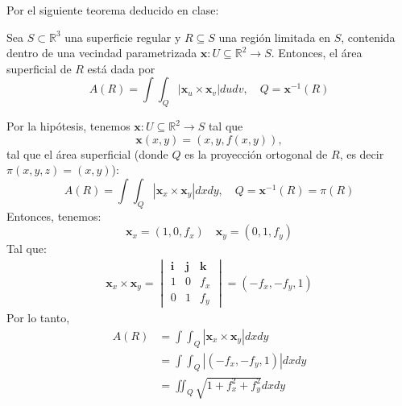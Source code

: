 \begin{problema}
\begin{dem}
\begin{figure}[H]
        \end{figure}
        Por el siguiente teorema deducido en clase: 
        \begin{cajita}
            Sea $S\subset \mathbb{R}^3$ una superficie regular y $R\subseteq S$ una región limitada en $S$, contenida dentro de una vecindad parametrizada $\mathbf{x}:U\subseteq \mathbb{R}^2\to S$. Entonces, el área superficial de $R$ está dada por 
            $$A(R)=\int\int_Q |\mathbf{x}_u\times \mathbf{x}_v|dudv, \quad Q=\mathbf{x}^{-1}(R)$$
        \end{cajita}
        Por la hipótesis, tenemos $\mathbf{x}:U\subseteq\mathbb{R}^2\to S$ tal que 
        $$\mathbf{x}(x,y)=(x,y,f(x,y)),$$
        tal que el área superficial (donde $Q$ es la proyección ortogonal de $R$, es decir $\pi(x,y,z)=(x,y)$): 
        $$A(R)=\int\int_Q |\mathbf{x}_x\times \mathbf{x}_y|dxdy, \quad Q=\mathbf{x}^{-1}(R)=\pi(R)$$
        Entonces, tenemos: 
        $$\mathbf{x}_x = \left(1,0,f_x\right) \quad \mathbf{x}_y = \left(0,1,f_y\right)$$
        Tal que: 
        \begin{align*}
            \mathbf{x}_x \times \mathbf{x}_y = \begin{vmatrix} \mathbf{i} & \mathbf{j} & \mathbf{k} \\
                 1 & 0 & f_x \\
                  0 & 1 & f_y \end{vmatrix} = \left(-f_x, -f_y, 1\right)
        \end{align*}
        Por lo tanto, 
        \begin{align*}
            A(R)&=\int\int_Q |\mathbf{x}_x\times \mathbf{x}_y|dxdy\\
            &= \int\int_Q |\left(-f_x, -f_y, 1\right)|dxdy\\
            &= \iint_{Q} \sqrt{1+f_{x}^{2}+f_{y}^{2}} d x d y
        \end{align*}
\end{dem}

\end{problema}

